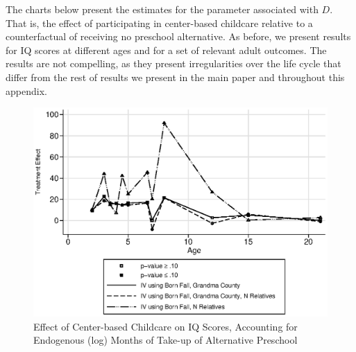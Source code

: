 \noindent The charts below present the estimates for the parameter associated with $D$. That is, the effect of participating in center-based childcare relative to a counterfactual of receiving no preschool alternative. As before, we present results for IQ scores at different ages and for a set of relevant adult outcomes. The results are not compelling, as they present irregularities over the life cycle that differ from the rest of results we present in the main paper and throughout this appendix.

\begin{figure}[H]
		\caption{Effect of Center-based Childcare on IQ Scores, Accounting for Endogenous (log) Months of Take-up of Alternative Preschool} \label{output/appendixplots/Q_cf_te.eps}
		\includegraphics[width=.8\columnwidth]{output/appendixplots/ins_inter_logQ_iv_te.eps}
\end{figure}

